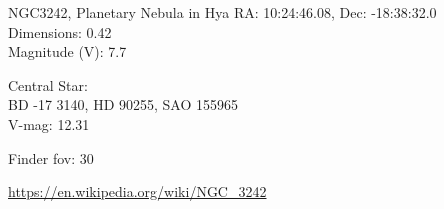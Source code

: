 \begin{block}{NGC3242, Planetary Nebula in Hya}
    RA: 10:24:46.08, Dec: -18:38:32.0 \\ 
    Dimensions: 0.42 \\ 
    Magnitude (V): 7.7


    Central Star: \\ 
      \hspace{1em}BD -17 3140, HD 90255, SAO 155965 \\ 
      \hspace{1em}V-mag: 12.31 


    Finder fov: 30 

    \url{https://en.wikipedia.org/wiki/NGC_3242} 
\end{block}